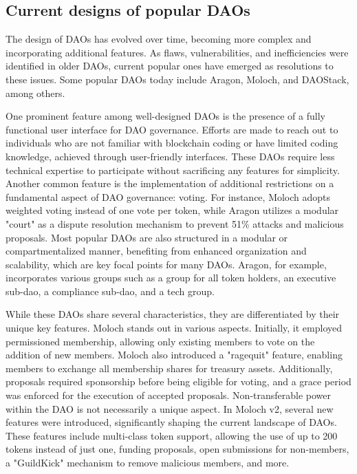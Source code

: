 \documentclass[main.tex]{subfiles}
\begin{document}
\subsection{Current designs of popular DAOs}

The design of DAOs has evolved over time, becoming more complex and incorporating additional features. As flaws, vulnerabilities, and inefficiencies were identified in older DAOs, current popular ones have emerged as resolutions to these issues. Some popular DAOs today include Aragon, Moloch, and DAOStack, among others.

One prominent feature among well-designed DAOs is the presence of a fully functional user interface for DAO governance. Efforts are made to reach out to individuals who are not familiar with blockchain coding or have limited coding knowledge, achieved through user-friendly interfaces. These DAOs require less technical expertise to participate without sacrificing any features for simplicity. Another common feature is the implementation of additional restrictions on a fundamental aspect of DAO governance: voting. For instance, Moloch adopts weighted voting instead of one vote per token, while Aragon utilizes a modular "court" as a dispute resolution mechanism to prevent 51\% attacks and malicious proposals. Most popular DAOs are also structured in a modular or compartmentalized manner, benefiting from enhanced organization and scalability, which are key focal points for many DAOs. Aragon, for example, incorporates various groups such as a group for all token holders, an executive sub-dao, a compliance sub-dao, and a tech group.

While these DAOs share several characteristics, they are differentiated by their unique key features. Moloch stands out in various aspects. Initially, it employed permissioned membership, allowing only existing members to vote on the addition of new members. Moloch also introduced a "ragequit" feature, enabling members to exchange all membership shares for treasury assets. Additionally, proposals required sponsorship before being eligible for voting, and a grace period was enforced for the execution of accepted proposals. Non-transferable power within the DAO is not necessarily a unique aspect. In Moloch v2, several new features were introduced, significantly shaping the current landscape of DAOs. These features include multi-class token support, allowing the use of up to 200 tokens instead of just one, funding proposals, open submissions for non-members, a "GuildKick" mechanism to remove malicious members, and more.
\end{document}

